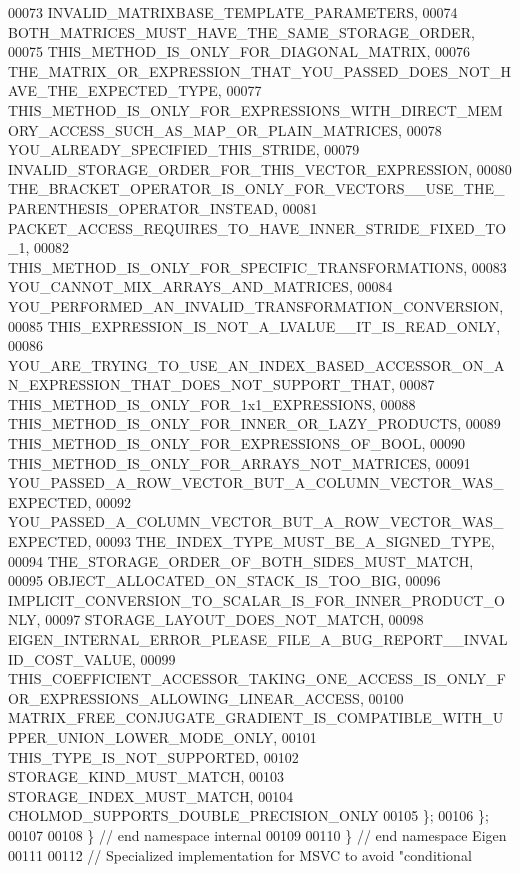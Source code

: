 \begin{DoxyCode}
00073         INVALID\_MATRIXBASE\_TEMPLATE\_PARAMETERS,
00074         BOTH\_MATRICES\_MUST\_HAVE\_THE\_SAME\_STORAGE\_ORDER,
00075         THIS\_METHOD\_IS\_ONLY\_FOR\_DIAGONAL\_MATRIX,
00076         THE\_MATRIX\_OR\_EXPRESSION\_THAT\_YOU\_PASSED\_DOES\_NOT\_HAVE\_THE\_EXPECTED\_TYPE,
00077         THIS\_METHOD\_IS\_ONLY\_FOR\_EXPRESSIONS\_WITH\_DIRECT\_MEMORY\_ACCESS\_SUCH\_AS\_MAP\_OR\_PLAIN\_MATRICES,
00078         YOU\_ALREADY\_SPECIFIED\_THIS\_STRIDE,
00079         INVALID\_STORAGE\_ORDER\_FOR\_THIS\_VECTOR\_EXPRESSION,
00080         THE\_BRACKET\_OPERATOR\_IS\_ONLY\_FOR\_VECTORS\_\_USE\_THE\_PARENTHESIS\_OPERATOR\_INSTEAD,
00081         PACKET\_ACCESS\_REQUIRES\_TO\_HAVE\_INNER\_STRIDE\_FIXED\_TO\_1,
00082         THIS\_METHOD\_IS\_ONLY\_FOR\_SPECIFIC\_TRANSFORMATIONS,
00083         YOU\_CANNOT\_MIX\_ARRAYS\_AND\_MATRICES,
00084         YOU\_PERFORMED\_AN\_INVALID\_TRANSFORMATION\_CONVERSION,
00085         THIS\_EXPRESSION\_IS\_NOT\_A\_LVALUE\_\_IT\_IS\_READ\_ONLY,
00086         YOU\_ARE\_TRYING\_TO\_USE\_AN\_INDEX\_BASED\_ACCESSOR\_ON\_AN\_EXPRESSION\_THAT\_DOES\_NOT\_SUPPORT\_THAT,
00087         THIS\_METHOD\_IS\_ONLY\_FOR\_1x1\_EXPRESSIONS,
00088         THIS\_METHOD\_IS\_ONLY\_FOR\_INNER\_OR\_LAZY\_PRODUCTS,
00089         THIS\_METHOD\_IS\_ONLY\_FOR\_EXPRESSIONS\_OF\_BOOL,
00090         THIS\_METHOD\_IS\_ONLY\_FOR\_ARRAYS\_NOT\_MATRICES,
00091         YOU\_PASSED\_A\_ROW\_VECTOR\_BUT\_A\_COLUMN\_VECTOR\_WAS\_EXPECTED,
00092         YOU\_PASSED\_A\_COLUMN\_VECTOR\_BUT\_A\_ROW\_VECTOR\_WAS\_EXPECTED,
00093         THE\_INDEX\_TYPE\_MUST\_BE\_A\_SIGNED\_TYPE,
00094         THE\_STORAGE\_ORDER\_OF\_BOTH\_SIDES\_MUST\_MATCH,
00095         OBJECT\_ALLOCATED\_ON\_STACK\_IS\_TOO\_BIG,
00096         IMPLICIT\_CONVERSION\_TO\_SCALAR\_IS\_FOR\_INNER\_PRODUCT\_ONLY,
00097         STORAGE\_LAYOUT\_DOES\_NOT\_MATCH,
00098         EIGEN\_INTERNAL\_ERROR\_PLEASE\_FILE\_A\_BUG\_REPORT\_\_INVALID\_COST\_VALUE,
00099         THIS\_COEFFICIENT\_ACCESSOR\_TAKING\_ONE\_ACCESS\_IS\_ONLY\_FOR\_EXPRESSIONS\_ALLOWING\_LINEAR\_ACCESS,
00100         MATRIX\_FREE\_CONJUGATE\_GRADIENT\_IS\_COMPATIBLE\_WITH\_UPPER\_UNION\_LOWER\_MODE\_ONLY,
00101         THIS\_TYPE\_IS\_NOT\_SUPPORTED,
00102         STORAGE\_KIND\_MUST\_MATCH,
00103         STORAGE\_INDEX\_MUST\_MATCH,
00104         CHOLMOD\_SUPPORTS\_DOUBLE\_PRECISION\_ONLY
00105       \};
00106     \};
00107 
00108     \} \textcolor{comment}{// end namespace internal}
00109 
00110     \} \textcolor{comment}{// end namespace Eigen}
00111 
00112     \textcolor{comment}{// Specialized implementation for MSVC to avoid "conditional}

\end{DoxyCode}
